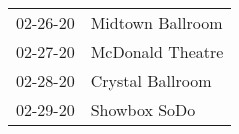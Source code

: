 \begin{supertabular}{p{0.07\textwidth}p{0.23\textwidth}}
 02-26-20 &  Midtown Ballroom \\
 02-27-20 &  McDonald Theatre \\
 02-28-20 &  Crystal Ballroom \\
 02-29-20 &      Showbox SoDo \\
\end{supertabular}
